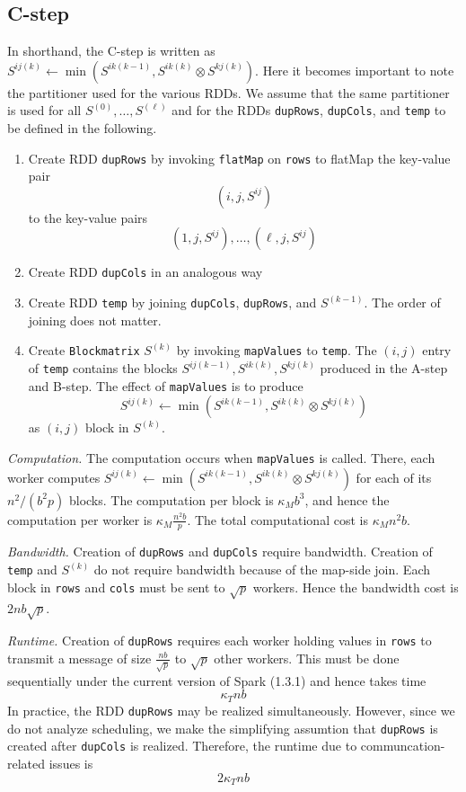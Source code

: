 \documentclass{article} %
\begin{document}
\subsection{C-step}

In shorthand, the C-step is written as $S^{ij(k)} \leftarrow \min(S^{ik(k-1)}, S^{ik(k)} \otimes S^{kj(k)})$.
Here it becomes important to note the partitioner used for the various RDDs.
We assume that the same partitioner is used for all $S^{(0)}, \hdots, S^{(\ell)}$
and for the RDDs {\tt dupRows}, {\tt dupCols}, and {\tt temp} to be defined in the following.

\begin{enumerate}
\item Create RDD {\tt dupRows} by invoking {\tt flatMap} on {\tt rows} to flatMap the key-value pair
\[
(i, j, S^{ij})
\]
to the key-value pairs
\[
(1, j, S^{ij}), \hdots, (\ell, j, S^{ij})
\]
\item Create RDD {\tt dupCols} in an analogous way
\item Create RDD {\tt temp} by joining {\tt dupCols}, {\tt dupRows},
  and $S^{(k-1)}$.  The order of joining does not matter.
\item Create {\tt Blockmatrix} $S^{(k)}$ by invoking {\tt mapValues}
  to {\tt temp}.  The $(i, j)$ entry of {\tt temp} contains the blocks
  $S^{ij(k-1)}, S^{ik(k)}, S^{kj(k)}$ produced in the A-step and
  B-step.  The effect of {\tt mapValues} is to produce
\[
S^{ij(k)} \leftarrow \min(S^{ik(k-1)}, S^{ik(k)} \otimes S^{kj(k)})
\]
as $(i, j)$ block in $S^{(k)}$.
\end{enumerate}

\emph{Computation.}  The computation occurs when {\tt mapValues} is
called.  There, each worker computes $S^{ij(k)} \leftarrow
\min(S^{ik(k-1)}, S^{ik(k)} \otimes S^{kj(k)})$ for each of its
$n^2/(b^2 p)$ blocks.  The computation per block is $\kappa_M b^3$, and
hence the computation per worker is $\kappa_M \frac{n^2b}{p}$.
The total computational cost is $\kappa_M n^2b$.

\emph{Bandwidth.} Creation of {\tt dupRows} and {\tt dupCols} require
bandwidth.  Creation of {\tt temp} and $S^{(k)}$ do not require
bandwidth because of the map-side join.  Each block in {\tt rows} and
{\tt cols} must be sent to $\sqrt{p}$ workers.
Hence the bandwidth cost is $2 n b \sqrt{p}$.

\emph{Runtime.}  Creation of {\tt dupRows} requires each worker
holding values in {\tt rows} to transmit a message of size
$\frac{nb}{\sqrt{p}}$ to $\sqrt{p}$ other workers.  This must be done
sequentially under the current version of Spark (1.3.1) and hence
takes time
\[
\kappa_T nb
\]
In practice, the RDD {\tt dupRows} may be realized simultaneously.
However, since we do not analyze scheduling, we make the simplifying
assumtion that {\tt dupRows} is created after {\tt dupCols} is
realized.
Therefore, the runtime due to communcation-related issues is
\[
2\kappa_T nb
\]
\end{document}
